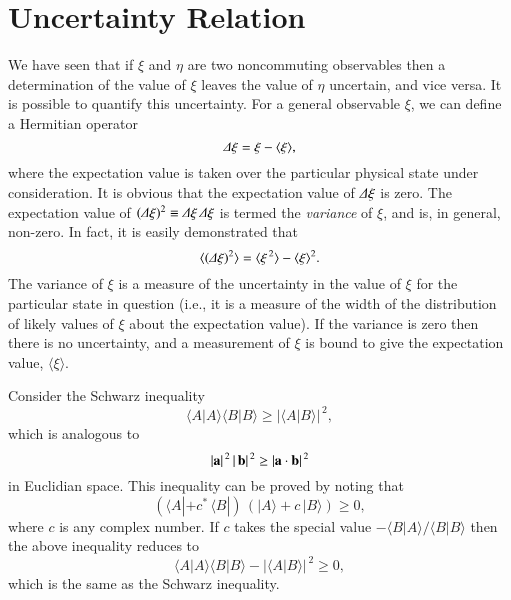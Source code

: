 \section{Uncertainty Relation}
We have seen that if $\xi$ and $\eta$ are two noncommuting observables then
a determination of the value of $\xi$ leaves the value of $\eta$ uncertain,
and {\rm vice versa}. It is possible to quantify this uncertainty. For
a general observable $\xi$, we can define a Hermitian operator
\begin{equation}
{\mit\Delta} \xi = \xi - \langle \xi \rangle,
\end{equation}
where the expectation value is taken over  the particular physical state under
consideration. It is obvious that the expectation value of ${\mit\Delta} \xi$ is zero.
The expectation value of $({\mit\Delta} \xi)^2 \equiv {\mit\Delta} \xi\,{\mit\Delta} \xi$ is termed
the {\em variance}\/ of $\xi$, and is, in general, non-zero. In fact,
it is easily demonstrated that
\begin{equation}
\langle({\mit\Delta} \xi)^2\rangle = \langle \xi^{\,2}\rangle - \langle \xi\rangle^2.
\end{equation}
The variance of $\xi$ is a measure of the uncertainty in the value of $\xi$ for
the particular state in question ({\rm i.e.}, it is a measure of the width of the 
distribution of likely values of $\xi$ about the expectation value). 
If the variance is zero then there is no uncertainty, and a measurement of $\xi$
is bound to give the expectation value, $\langle\xi\rangle$. 

Consider the Schwarz inequality
\begin{equation}
\langle A|A\rangle \langle B|B\rangle \geq |\langle A|B\rangle|^{\,2},
\end{equation}
which is analogous to
\begin{equation}
|{\bf a}|^{\,2} \,|\,{\bf b}|^{\,2} \geq |{\bf a}\cdot {\bf b}|^{\,2}
\end{equation}
in Euclidian space. This inequality can be proved by noting that
\begin{equation}
(\langle A| + c^\ast\, \langle B|)\, (|A\rangle + c\, |B\rangle) \geq 0,
\end{equation}
where $c$ is any  complex number. If $c$ takes the special value
$-\langle B|A\rangle/\langle B|B\rangle$ then the above inequality reduces to
\begin{equation}
\langle A|A\rangle \langle B|B\rangle - |\langle A|B\rangle|^{\,2} \geq 0,
\end{equation}
which is the same as the Schwarz inequality. 

